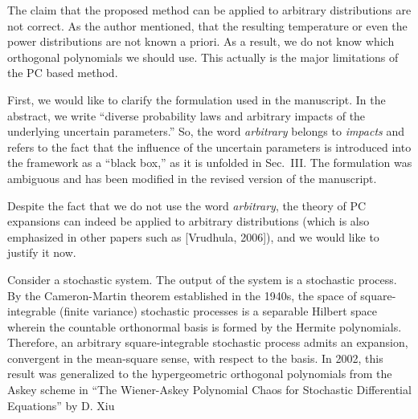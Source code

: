 \begin{reviewer}
The claim that the proposed method can be applied to arbitrary distributions are not correct. As the author mentioned, that the resulting temperature or even the power distributions are not known a priori. As a result, we do not know which orthogonal polynomials we should use. This actually is the major limitations of the PC based method.
\end{reviewer}
\begin{authors}
First, we would like to clarify the formulation used in the manuscript.
In the abstract, we write ``diverse probability laws and arbitrary impacts of the underlying uncertain parameters.''
So, the word \emph{arbitrary} belongs to \emph{impacts} and refers to the fact that the influence of the uncertain parameters is introduced into the framework as a ``black box,'' as it is unfolded in Sec.~III.
The formulation was ambiguous and has been modified in the revised version of the manuscript.

Despite the fact that we do not use the word \emph{arbitrary}, the theory of PC expansions can indeed be applied to arbitrary distributions (which is also emphasized in other papers such as [Vrudhula, 2006]), and we would like to justify it now.

Consider a stochastic system.
The output of the system is a stochastic process.
By the Cameron-Martin theorem established in the 1940s, the space of square-integrable (finite variance) stochastic processes is a separable Hilbert space wherein the countable orthonormal basis is formed by the Hermite polynomials.
Therefore, an arbitrary square-integrable stochastic process admits an expansion, convergent in the mean-square sense, with respect to the basis.
In 2002, this result was generalized to the hypergeometric orthogonal polynomials from the Askey scheme in ``The Wiener-Askey Polynomial Chaos for Stochastic Differential Equations'' by D. Xiu \etal


\end{authors}
